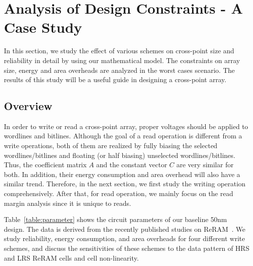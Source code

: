 \section{Analysis of Design Constraints - A Case Study}\label{sec:w_and_r}

In this section, we study the effect of various schemes on cross-point
size and reliability in detail by using our mathematical model. The
constraints on array size, energy and area overheads are analyzed in the
worst cases scenario. The results of this study will be a useful guide in
designing a cross-point array.

\vspace{-10pt}
\subsection{Overview}
In order to write or read a cross-point array, proper voltages should be
applied to wordlines and bitlines. Although the goal of a read operation
is different from a write operations, both of them are realized by fully
biasing the selected wordlines/bitlines and floating (or half biasing)
unselected wordlines/bitlines. Thus, the coefficient matrix $A$ and the
constant vector $C$ are very similar for both. In addition, their energy
consumption and area overhead will also have a similar trend. Therefore,
in the next section, we first study the writing operation comprehensively.
After that, for read operation, we mainly focus on the read margin
analysis since it is unique to reads.

Table~\ref{table:parameter} shows the circuit parameters of our baseline
50nm design. The data is derived from the recently published studies on
ReRAM~\cite{?????,memristor:Cong}. We study reliability, energy
consumption, and area overheads for four different write schemes, and
discuss the sensitivities of these schemes to the data pattern of HRS and
LRS ReRAM cells and cell non-linearity.

